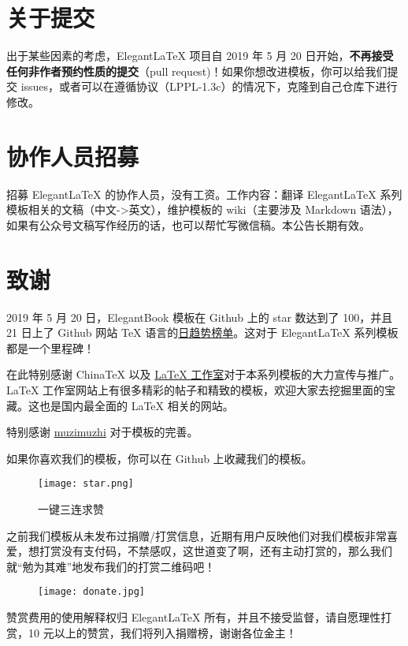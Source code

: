\documentclass[cn,11pt]{elegantbook}
\begin{document}
\section{关于提交}
出于某些因素的考虑，Elegant\LaTeX{} 项目自 2019 年 5 月 20 日开始，\textbf{不再接受任何非作者预约性质的提交}（pull request)！如果你想改进模板，你可以给我们提交 issues，或者可以在遵循协议（LPPL-1.3c）的情况下，克隆到自己仓库下进行修改。

\section{协作人员招募}
招募 Elegant\LaTeX{} 的协作人员，没有工资。工作内容：翻译 Elegant\LaTeX{} 系列模板相关的文稿（中文->英文），维护模板的 wiki（主要涉及 Markdown 语法），如果有公众号文稿写作经历的话，也可以帮忙写微信稿。本公告长期有效。

\section{致谢}
2019 年 5 月 20 日，ElegantBook 模板在 Github 上的 star 数达到了 100，并且 21 日上了 Github 网站 \TeX{} 语言的\href{https://github.com/trending/tex?since=daily}{日趋势榜单}。这对于 Elegant\LaTeX{} 系列模板都是一个里程碑！

在此特别感谢 China\TeX{} 以及 \href{http://www.latexstudio.net/}{\LaTeX{} 工作室}对于本系列模板的大力宣传与推广。\LaTeX{} 工作室网站上有很多精彩的帖子和精致的模板，欢迎大家去挖掘里面的宝藏。这也是国内最全面的 \LaTeX{} 相关的网站。

特别感谢 \href{https://github.com/muzimuzhi}{muzimuzhi} 对于模板的完善。

如果你喜欢我们的模板，你可以在 Github 上收藏我们的模板。
\begin{figure}[htbp]
\centering
\texttt{[image: star.png]}
\caption{一键三连求赞}
\end{figure}

之前我们模板从未发布过捐赠/打赏信息，近期有用户反映他们对我们模板非常喜爱，想打赏没有支付码，不禁感叹，这世道变了啊，还有主动打赏的，那么我们就“勉为其难”地发布我们的打赏二维码吧！

\begin{figure}[htbp]
\centering
\texttt{[image: donate.jpg]}
\end{figure}

赞赏费用的使用解释权归 Elegant\LaTeX{} 所有，并且不接受监督，请自愿理性打赏，10 元以上的赞赏，我们将列入捐赠榜，谢谢各位金主！
\end{document}
